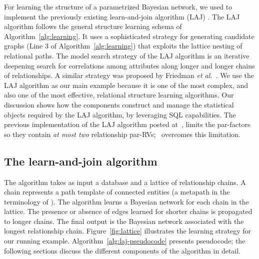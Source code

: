 For learning the structure of a parametrized Bayesian network, we used \FB  to implement the previously existing learn-and-join algorithm (LAJ) \cite{Khosravi2010,Schulte2012}. The LAJ algorithm follows the general structure learning schema of Algorithm~\ref{alg:learning}. It uses a sophisticated strategy for generating candidate graphs (Line 3 of Algorithm~\ref{alg:learning}) that exploits the lattice nesting of relational paths.
The model search strategy of the LAJ algorithm is an iterative deepening search for correlations among attributes along longer and longer chains of relationships. A similar strategy was proposed by Friedman {\em et al.}~\cite{friedman99prm}. We use the LAJ algorithm as our main example because it is one of the most complex, and also one of the most effective, relational structure learning algorithms. Our discussion shows how the \FB components construct and manage the statistical objects required by the LAJ algorithm, by leveraging SQL capabilities. The previous implementation of the LAJ algorithm posted at~\cite{bib:bbsite}, limits the par-factors so they contain {\em at most  two} relationship par-RVs; ~\FB  overcomes this limitation.

\subsection{The learn-and-join algorithm}
The algorithm takes as input a database and a lattice of relationship chains. A chain represents a path template of connected entities (a metapath in the terminology of \cite{Sun2012}). The algorithm learns a Bayesian network for each chain in the lattice. The presence or absence of edges learned for shorter chains is propagated to longer chains. The final output is the Bayesian network associated with the longest relationship chain. Figure~\ref{fig:lattice} illustrates the learning strategy for our running example. Algorithm~\ref{alg:laj-pseudocode} presents pseudocode; the following sections discuss the different components of the algorithm in detail.


